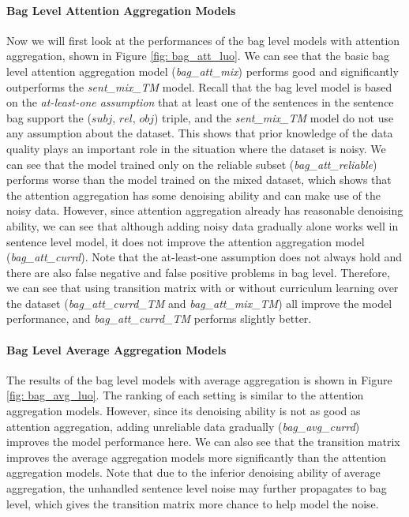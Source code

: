 \paragraph{Bag Level Attention Aggregation Models}
Now we will first look at the performances of the bag level models with attention aggregation, shown in Figure \ref{fig: bag_att_luo}. We can see that the basic bag level attention aggregation model (\emph{bag\_att\_mix}) performs good and significantly outperforms the \emph{sent\_mix\_TM} model. Recall that the bag level model is based on the \emph{at-least-one assumption} that at least one of the sentences in the sentence bag support the ($subj$, $rel$, $obj$) triple, and the \emph{sent\_mix\_TM} model do not use any assumption about the dataset. This shows that prior knowledge of the data quality plays an important role in the situation where the dataset is noisy. We can see that the model trained only on the reliable subset (\emph{bag\_att\_reliable}) performs worse than the model trained on the mixed dataset, which shows that the attention aggregation has some denoising ability and can make use of the noisy data. However, since attention aggregation already has reasonable denoising ability, we can see that although adding noisy data gradually alone works well in sentence level model, it does not improve the attention aggregation model (\emph{bag\_att\_currd}). Note that the at-least-one assumption does not always hold and there are also false negative and false positive problems in bag level. Therefore, we can see that using transition matrix with or without curriculum learning over the dataset (\emph{bag\_att\_currd\_TM} and \emph{bag\_att\_mix\_TM}) all improve the model performance, and \emph{bag\_att\_currd\_TM} performs slightly better.

\paragraph{Bag Level Average Aggregation Models}
The results of the bag level models with average aggregation is shown in Figure \ref{fig: bag_avg_luo}. The ranking of each setting is similar to the attention aggregation models. However, since its denoising ability is not as good as attention aggregation, adding unreliable data gradually (\emph{bag\_avg\_currd}) improves the model performance here. We can also see that the transition matrix improves the average aggregation models more significantly than the attention aggregation models. Note that due to the inferior denoising ability of average aggregation, the unhandled sentence level noise may further propagates to bag level, which gives the transition matrix more chance to help model the noise.

